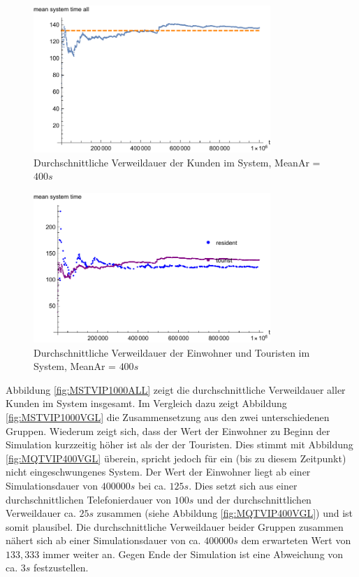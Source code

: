 \begin{figure}[htpb]
	\centering
	\includegraphics[width=0.8\textwidth]{abbildungen/1_Phone_VIP/Arrival_400_Serve_100_dur_1000000_Skip_0/MeanSystemTimeAll.pdf}
	\caption{Durchschnittliche Verweildauer der Kunden im System, MeanAr = $400s$}
	\label{fig:MSTVIP400ALL}
\end{figure} 

\begin{figure}[htpb]
	\centering
	\includegraphics[width=0.8\textwidth]{abbildungen/1_Phone_VIP/Arrival_400_Serve_100_dur_1000000_Skip_0/MeanSystemTimeTouristAndResident.pdf}
	\caption{Durchschnittliche Verweildauer der Einwohner und Touristen im System, MeanAr = $400s$}
	\label{fig:MSTVIP400VGL}
\end{figure}

Abbildung \ref{fig:MSTVIP1000ALL} zeigt die durchschnittliche Verweildauer aller Kunden im System insgesamt. Im Vergleich dazu zeigt Abbildung \ref{fig:MSTVIP1000VGL} die Zusammensetzung aus den zwei unterschiedenen Gruppen. Wiederum zeigt sich, dass der Wert der Einwohner zu Beginn der Simulation kurzzeitig höher ist als der der Touristen. Dies stimmt mit Abbildung \ref{fig:MQTVIP400VGL} überein, spricht jedoch für ein (bis zu diesem Zeitpunkt) nicht eingeschwungenes System. Der Wert der Einwohner liegt ab einer Simulationsdauer von $400000s$ bei ca. $125s$. Dies setzt sich aus einer durchschnittlichen Telefonierdauer von $100s$ und der durchschnittlichen Verweildauer ca. $25s$ zusammen (siehe Abbildung \ref{fig:MQTVIP400VGL})  und ist somit plausibel. Die durchschnittliche Verweildauer beider Gruppen zusammen nähert sich ab einer Simulationsdauer von ca. $400000s$ dem erwarteten Wert von $133,333$ immer weiter an. Gegen Ende der Simulation ist eine Abweichung von ca. $3s$ festzustellen.  

